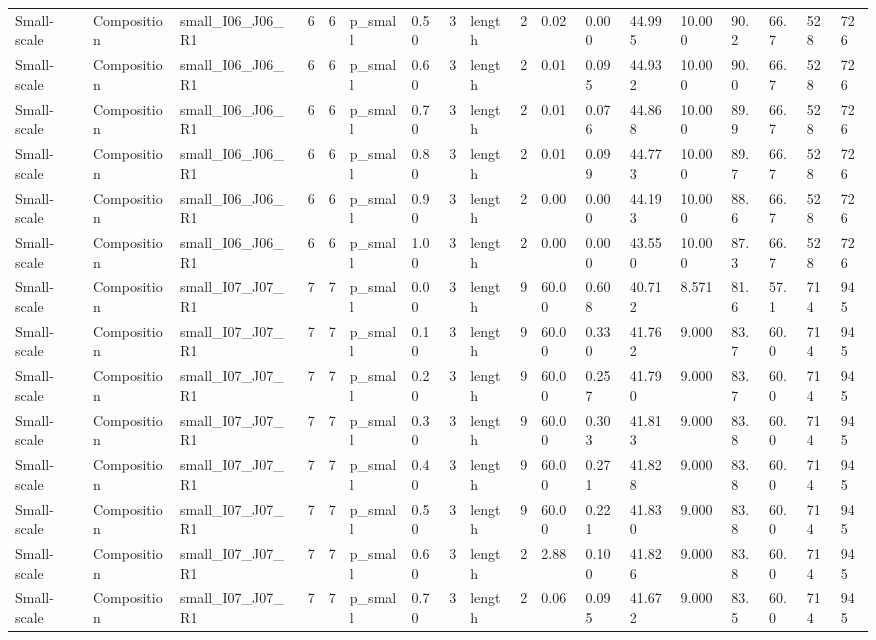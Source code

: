 \begin{longtable}{lllrrllllrllllllll}
Small-scale & Composition & small\_I06\_J06\_R1 & 6 & 6 & p\_small & 0.50 & 3 & length & 2 & 0.02 & 0.000 & 44.995 & 10.000 & 90.2 & 66.7 & 528 & 726 \\
Small-scale & Composition & small\_I06\_J06\_R1 & 6 & 6 & p\_small & 0.60 & 3 & length & 2 & 0.01 & 0.095 & 44.932 & 10.000 & 90.0 & 66.7 & 528 & 726 \\
Small-scale & Composition & small\_I06\_J06\_R1 & 6 & 6 & p\_small & 0.70 & 3 & length & 2 & 0.01 & 0.076 & 44.868 & 10.000 & 89.9 & 66.7 & 528 & 726 \\
Small-scale & Composition & small\_I06\_J06\_R1 & 6 & 6 & p\_small & 0.80 & 3 & length & 2 & 0.01 & 0.099 & 44.773 & 10.000 & 89.7 & 66.7 & 528 & 726 \\
Small-scale & Composition & small\_I06\_J06\_R1 & 6 & 6 & p\_small & 0.90 & 3 & length & 2 & 0.00 & 0.000 & 44.193 & 10.000 & 88.6 & 66.7 & 528 & 726 \\
Small-scale & Composition & small\_I06\_J06\_R1 & 6 & 6 & p\_small & 1.00 & 3 & length & 2 & 0.00 & 0.000 & 43.550 & 10.000 & 87.3 & 66.7 & 528 & 726 \\
Small-scale & Composition & small\_I07\_J07\_R1 & 7 & 7 & p\_small & 0.00 & 3 & length & 9 & 60.00 & 0.608 & 40.712 & 8.571 & 81.6 & 57.1 & 714 & 945 \\
Small-scale & Composition & small\_I07\_J07\_R1 & 7 & 7 & p\_small & 0.10 & 3 & length & 9 & 60.00 & 0.330 & 41.762 & 9.000 & 83.7 & 60.0 & 714 & 945 \\
Small-scale & Composition & small\_I07\_J07\_R1 & 7 & 7 & p\_small & 0.20 & 3 & length & 9 & 60.00 & 0.257 & 41.790 & 9.000 & 83.7 & 60.0 & 714 & 945 \\
Small-scale & Composition & small\_I07\_J07\_R1 & 7 & 7 & p\_small & 0.30 & 3 & length & 9 & 60.00 & 0.303 & 41.813 & 9.000 & 83.8 & 60.0 & 714 & 945 \\
Small-scale & Composition & small\_I07\_J07\_R1 & 7 & 7 & p\_small & 0.40 & 3 & length & 9 & 60.00 & 0.271 & 41.828 & 9.000 & 83.8 & 60.0 & 714 & 945 \\
Small-scale & Composition & small\_I07\_J07\_R1 & 7 & 7 & p\_small & 0.50 & 3 & length & 9 & 60.00 & 0.221 & 41.830 & 9.000 & 83.8 & 60.0 & 714 & 945 \\
Small-scale & Composition & small\_I07\_J07\_R1 & 7 & 7 & p\_small & 0.60 & 3 & length & 2 & 2.88 & 0.100 & 41.826 & 9.000 & 83.8 & 60.0 & 714 & 945 \\
Small-scale & Composition & small\_I07\_J07\_R1 & 7 & 7 & p\_small & 0.70 & 3 & length & 2 & 0.06 & 0.095 & 41.672 & 9.000 & 83.5 & 60.0 & 714 & 945 \\

\end{longtable}
